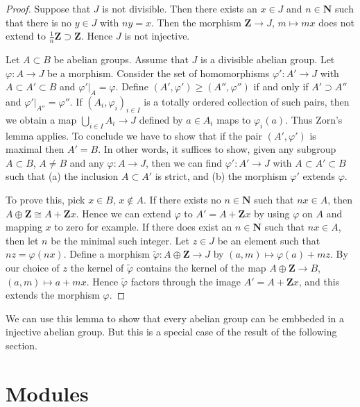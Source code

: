 \begin{proof}
Suppose that $J$ is not divisible. Then there exists
an $x \in J$ and $n \in \mathbf{N}$ such that there
is no $y \in J$ with $n y = x$. Then the morphism
$\mathbf{Z} \to J$, $m \mapsto mx$ does not extend
to $\frac{1}{n}\mathbf{Z} \supset \mathbf{Z}$. Hence
$J$ is not injective.

\medskip\noindent
Let $A \subset B$ be abelian groups.
Assume that $J$ is a divisible abelian group.
Let $\varphi : A \to J$ be a morphism. 
Consider the set of homomorphisms $\varphi' : A' \to J$
with $A \subset A' \subset B$ and $\varphi'|_A = \varphi$.
Define $(A', \varphi') \geq (A'', \varphi'')$ if
and only if $A' \supset A''$ and $\varphi'|_{A''} = \varphi''$.
If $(A_i, \varphi_i)_{i \in I}$ is a totally
ordered collection of such pairs, then we obtain a map
$\bigcup_{i \in I} A_i \to J$ defined by $a \in A_i$
maps to $\varphi_i(a)$. Thus Zorn's lemma applies.
To conclude we have to show that if the pair
$(A', \varphi')$ is maximal then $A' = B$.
In other words, it suffices to show, given
any subgroup $A \subset B$, $A \not = B$ and
any $\varphi : A \to J$, then we can find
$\varphi' : A' \to J$ with $A \subset A' \subset B$
such that (a) the inclusion $A \subset A'$ is strict, and
(b) the morphism $\varphi'$ extends $\varphi$.

\medskip\noindent
To prove this, pick $x \in B$, $x \not \in A$.
If there exists no $n\in \mathbf{N}$ such that
$nx \in A$, then $A \oplus \mathbf{Z} \cong A + \mathbf{Z}x$.
Hence we can extend $\varphi$ to $A' = A + \mathbf{Z}x$
by using $\varphi$ on $A$ and mapping $x$ to zero for example.
If there does exist an $n \in \mathbf{N}$ such that
$nx \in A$, then let $n$ be the minimal such integer.
Let $z \in J$ be an element such that $nz = \varphi(nx)$.
Define a morphism $\tilde\varphi : A \oplus \mathbf{Z} \to J$ by
$(a, m) \mapsto \varphi(a) + mz$. By our choice of
$z$ the kernel of $\tilde \varphi$ contains the kernel
of the map $A \oplus \mathbf{Z} \to B$,
$(a, m) \mapsto a + mx$. Hence $\tilde \varphi$ factors
through the image $A' = A + \mathbf{Z}x$, and this extends the morphism
$\varphi$.
\end{proof}

\noindent
We can use this lemma to show that every abelian
group can be embbeded in a injective abelian
group. But this is a special case of the result of
the following section.

\section{Modules}
\label{section-injectives-modules}

